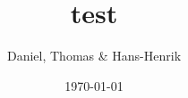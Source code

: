 \documentclass[a4paper, article, 11pt, oneside]{memoir}
\title{test}
\author{Daniel, Thomas \& Hans-Henrik}
\date{\today}
\begin{document}
\maketitle
\tableofcontents*
\newpage


\end{document}
